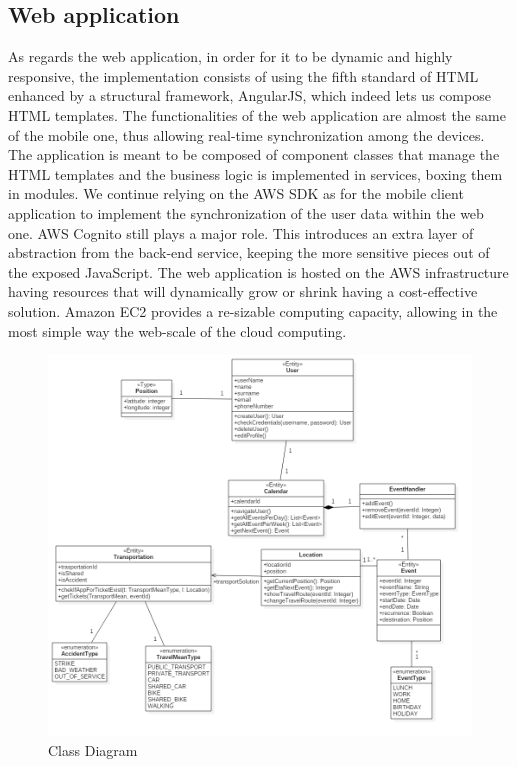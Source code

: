 \subsection*{Web application}
As regards the web application, in order for it to be dynamic and highly responsive, the implementation consists of using the fifth standard of HTML enhanced by a structural framework, AngularJS, which indeed lets us compose HTML templates. The functionalities of the web application are almost the same of the mobile one, thus allowing real-time synchronization among the devices. The application is meant to be composed of component classes that manage the HTML templates and the business logic is implemented in services, boxing them in modules. We continue relying on the AWS SDK as for the mobile client application to implement the synchronization of the user data within the web one. 
AWS Cognito still plays a major role. This introduces an extra layer of abstraction from the back-end service, keeping the more sensitive pieces out of the exposed JavaScript.
The web application is hosted on the AWS infrastructure having resources that will dynamically grow or shrink having a cost-effective solution. Amazon EC2 provides a re-sizable computing capacity, allowing in the most simple way the web-scale of the cloud computing.

\begin{figure}
	\centering
	\includegraphics[width=6in]{./diagrams/ClassDiagram.png}
	\caption{Class Diagram}
	\label{fig:seqLogin}
\end{figure}

